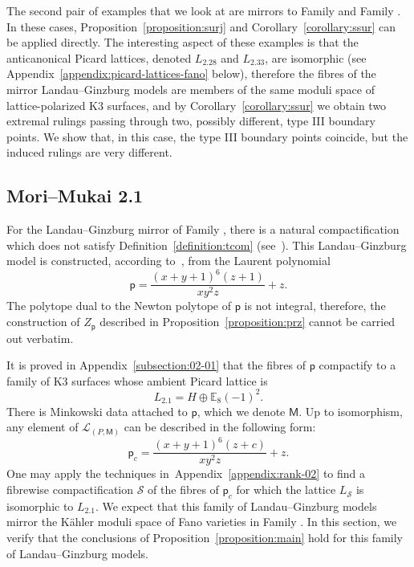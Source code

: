 \documentclass[10pt]{amsart}
\numberwithin{equation}{section}
\theoremstyle{plain}
\theoremstyle{definition}
\theoremstyle{remark}
\begin{document}
The second pair of examples that we look at are mirrors to Family  and Family . In these cases, Proposition~\ref{proposition:surj} and Corollary~\ref{corollary:ssur} can be applied directly. The interesting aspect of these examples is that the anticanonical Picard lattices, denoted \(L_{{2.28}}\) and \(L_{{2.33}}\), are isomorphic (see Appendix~\ref{appendix:picard-lattices-fano} below), therefore the fibres of the mirror Landau--Ginzburg models are members of the same moduli space of lattice-polarized K3 surfaces, and by Corollary~\ref{corollary:ssur} we obtain two extremal rulings passing through two, possibly different, type III boundary points. We show that, in this case, the type III boundary points coincide, but the induced rulings are very different.

\subsection{Mori--Mukai 2.1}\label{subsection:MM21}

For the Landau--Ginzburg mirror of Family , there is a natural compactification which does not satisfy Definition~\ref{definition:tcom} (see~\cite{przyjalkowski2022singular}). This Landau--Ginzburg model is constructed, according to~\cite{ilten2013toric}, from the Laurent polynomial
\begin{equation*}
  \mathsf{p} = \dfrac{(x + y + 1)^6(z + 1)}{xy^2z} + z.
\end{equation*}
The polytope dual to the Newton polytope of \(\mathsf{p}\) is not integral, therefore, the construction of \(Z_{\mathsf{p}}\) described in Proposition~\ref{proposition:prz} cannot be carried out verbatim.

It is proved in Appendix~\ref{subsection:02-01} that the fibres of \(\mathsf{p}\) compactify to a family of K3 surfaces whose ambient Picard lattice is
\[
  L_{2.1} = H \oplus \mathbb{E}_8(-1)^2.
\]
There is Minkowski data attached to \(\mathsf{p}\), which we denote \(\mathsf{M}\). Up to isomorphism, any element of \(\mathcal{L}_{(P,\mathsf{M})}\) can be described in the following form:
\begin{equation}\label{equation:2.1}
  \mathsf{p}_c = \dfrac{(x + y + 1)^6(z + c)}{xy^2z} + z.
\end{equation}
One may apply the techniques in~Appendix~\ref{appendix:rank-02} to find a fibrewise compactification \(\mathcal{S}\) of the fibres of \(\mathsf{p}_c\) for which the lattice \(L_\mathcal{S}\) is isomorphic to \(L_{2.1}\). We expect that this family of Landau--Ginzburg models mirror the K\"ahler moduli space of Fano varieties in Family . In this section, we verify that the conclusions of Proposition~\ref{proposition:main} hold for this family of Landau--Ginzburg models.
\end{document}
